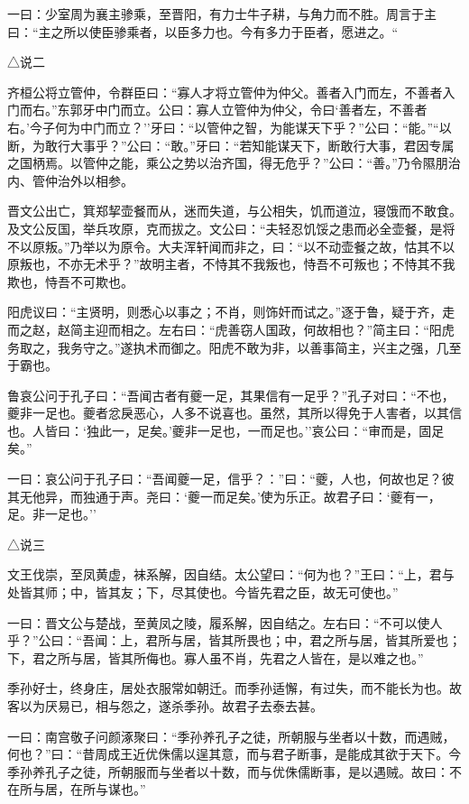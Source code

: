 \documentclass[]{article}
\begin{document}
一曰：少室周为襄主骖乘，至晋阳，有力士牛子耕，与角力而不胜。周言于主曰：``主之所以使臣骖乘者，以臣多力也。今有多力于臣者，愿进之。``

△说二

齐桓公将立管仲，令群臣曰：``寡人才将立管仲为仲父。善者入门而左，不善者入门而右。''东郭牙中门而立。公曰：寡人立管仲为仲父，令曰`善者左，不善者右。'今子何为中门而立？''牙曰：``以管仲之智，为能谋天下乎？''公曰：``能。''``以断，为敢行大事乎？''公曰：``敢。''牙曰：``若知能谋天下，断敢行大事，君因专属之国柄焉。以管仲之能，乘公之势以治齐国，得无危乎？''公曰：``善。''乃令隰朋治内、管仲治外以相参。

晋文公出亡，箕郑挈壶餐而从，迷而失道，与公相失，饥而道泣，寝饿而不敢食。及文公反国，举兵攻原，克而拔之。文公曰：``夫轻忍饥馁之患而必全壶餐，是将不以原叛。''乃举以为原令。大夫浑轩闻而非之，曰：``以不动壶餐之故，怙其不以原叛也，不亦无术乎？''故明主者，不恃其不我叛也，恃吾不可叛也；不恃其不我欺也，恃吾不可欺也。

阳虎议曰：``主贤明，则悉心以事之；不肖，则饰奸而试之。''逐于鲁，疑于齐，走而之赵，赵简主迎而相之。左右曰：``虎善窃人国政，何故相也？''简主曰：``阳虎务取之，我务守之。''遂执术而御之。阳虎不敢为非，以善事简主，兴主之强，几至于霸也。

鲁哀公问于孔子曰：``吾闻古者有夔一足，其果信有一足乎？''孔子对曰：``不也，夔非一足也。夔者忿戾恶心，人多不说喜也。虽然，其所以得免于人害者，以其信也。人皆曰：`独此一，足矣。'夔非一足也，一而足也。''哀公曰：``审而是，固足矣。''

一曰：哀公问于孔子曰：``吾闻夔一足，信乎？：''曰：``夔，人也，何故也足？彼其无他异，而独通于声。尧曰：`夔一而足矣。'使为乐正。故君子曰：`夔有一，足。非一足也。''

△说三

文王伐崇，至凤黄虚，袜系解，因自结。太公望曰：``何为也？''王曰：``上，君与处皆其师；中，皆其友；下，尽其使也。今皆先君之臣，故无可使也。''

一曰：晋文公与楚战，至黄凤之陵，履系解，因自结之。左右曰：``不可以使人乎？''公曰：``吾闻：上，君所与居，皆其所畏也；中，君之所与居，皆其所爱也；下，君之所与居，皆其所侮也。寡人虽不肖，先君之人皆在，是以难之也。''

季孙好士，终身庄，居处衣服常如朝迁。而季孙适懈，有过失，而不能长为也。故客以为厌易已，相与怨之，遂杀季孙。故君子去泰去甚。

一曰：南宫敬子问颜涿聚曰：``季孙养孔子之徒，所朝服与坐者以十数，而遇贼，何也？''曰：``昔周成王近优侏儒以逞其意，而与君子断事，是能成其欲于天下。今季孙养孔子之徒，所朝服而与坐者以十数，而与优侏儒断事，是以遇贼。故曰：不在所与居，在所与谋也。''
\end{document}
